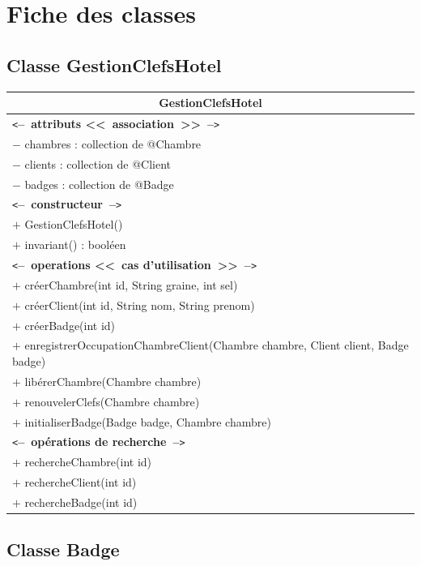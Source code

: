 \documentclass[11pt,article]{article}
\newcommand{\cmt}[1]{\texttt{<}\textbf{--~#1~--}\texttt{>}}
\begin{document}
\newpage

\section{Fiche des classes}

\subsection{Classe \textsf{GestionClefsHotel}}

\begin{center}
\begin{longtable}{|p{15cm}|}
\hline
\multicolumn{1}{|c|}{{\Large \textsf{GestionClefsHotel}}} \\
\hline
\cmt{attributs <<~association~>>}\\
$-$ chambres : collection de @Chambre \\
$-$ clients : collection de @Client \\
$-$ badges : collection de @Badge \\
\hline
\cmt{constructeur} \\
$+$ GestionClefsHotel()\\
$+$ invariant() : booléen\\
\cmt{operations <<~cas d'utilisation~>>} \\
$+$ créerChambre(int id, String graine, int sel) \\
$+$ créerClient(int id, String nom, String prenom) \\
$+$ créerBadge(int id) \\
$+$ enregistrerOccupationChambreClient(Chambre chambre, Client client, Badge badge) \\
$+$ libérerChambre(Chambre chambre) \\
$+$ renouvelerClefs(Chambre chambre) \\
$+$ initialiserBadge(Badge badge, Chambre chambre) \\
\cmt{opérations de recherche} \\
$+$ rechercheChambre(int id) \\
$+$ rechercheClient(int id) \\
$+$ rechercheBadge(int id) \\
\hline
\end{longtable}%
\end{center}

\subsection{Classe \textsf{Badge}}
\end{document}
